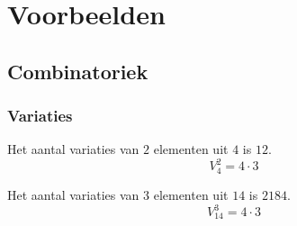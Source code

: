 \documentclass[main.tex]{subfiles}
\begin{document}
\chapter{Voorbeelden}
\label{cha:voorbeelden}



\section{Combinatoriek}
\subsection*{Variaties}

\begin{vb}
  Het aantal variaties van $2$ elementen uit $4$ is $12$.
  \[ V_{4}^{2} = 4 \cdot 3 \]
\end{vb}

\begin{vb}
  Het aantal variaties van $3$ elementen uit $14$ is $2184$.
  \[ V_{14}^{3} = 4 \cdot 3 \]
\end{vb}
\end{document}
